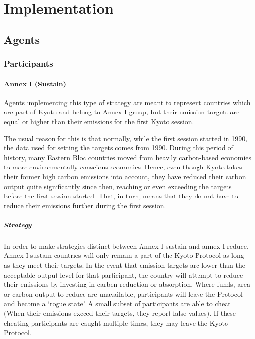 \section{Implementation}

\subsection{Agents}

%
%

\subsubsection{Participants}

%
%

\paragraph{Annex I (Sustain)}

Agents implementing this type of strategy are meant to represent countries which are part of Kyoto and belong to Annex I group, but their emission targets are equal or higher than their emissions for the first Kyoto session.

The usual reason for this is that normally, while the first session started in 1990, the data used for setting the targets comes from 1990. During this period of history, many Eastern Bloc countries moved from heavily carbon-based economies to more environmentally conscious economies. Hence, even though Kyoto takes their former high carbon emissions into account, they have reduced their carbon output quite significantly since then, reaching or even exceeding the targets before the first session started. That, in turn, means that they do not have to reduce their emissions further during the first session.

\subparagraph{Strategy}

In order to make strategies distinct between Annex I sustain and annex I reduce, Annex I sustain countries will only remain a part of the Kyoto Protocol as long as they meet their targets. In the event that emission targets are lower than the acceptable output level for that participant, the country will attempt to reduce their emissions by investing in carbon reduction or absorption. Where funds, area or carbon output to reduce are unavailable, participants will leave the Protocol and become a `rogue state'. A small subset of participants are able to cheat (When their emissions exceed their targets, they report false values). If these cheating participants are caught multiple times, they may leave the Kyoto Protocol.


